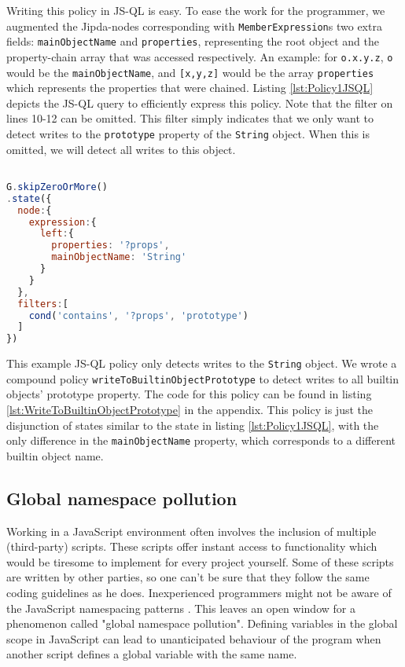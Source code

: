 Writing this policy in JS-QL is easy. To ease the work for the programmer, we augmented the Jipda-nodes corresponding with \texttt{MemberExpression}s two extra fields: \texttt{mainObjectName} and \texttt{properties}, representing the root object and the property-chain array that was accessed respectively. An example: for \texttt{o.x.y.z}, \texttt{o} would be the \texttt{mainObjectName}, and \texttt{[x,y,z]} would be the array \texttt{properties} which represents the properties that were chained. Listing \ref{lst:Policy1JSQL} depicts the JS-QL query to efficiently express this policy. Note that the filter on lines 10-12 can be omitted. This filter simply indicates that we only want to detect writes to the \texttt{prototype} property of the \texttt{String} object. When this is omitted, we will detect all writes to this object.

\begin{lstlisting}[label={lst:Policy1JSQL},language=JavaScript,caption=Policy 1 in JS-QL,mathescape=true]  % float=t?

G.skipZeroOrMore()
.state({
  node:{
    expression:{
      left:{
        properties: '?props',
        mainObjectName: 'String'
      }
    }
  },
  filters:[
    cond('contains', '?props', 'prototype')
  ]
})

\end{lstlisting}

This example JS-QL policy only detects writes to the \texttt{String} object. We wrote a compound policy \texttt{writeToBuiltinObjectPrototype} to detect writes to all builtin objects' prototype property. The code for this policy can be found in listing \ref{lst:WriteToBuiltinObjectPrototype} in the appendix. This policy is just the disjunction of states similar to the state in listing \ref{lst:Policy1JSQL}, with the only difference in the \texttt{mainObjectName} property, which corresponds to a different builtin object name.

\subsection{Global namespace pollution}

Working in a JavaScript environment often involves the inclusion of multiple (third-party) scripts. These scripts offer instant access to functionality which would be tiresome to implement for every project yourself. Some of these scripts are written by other parties, so one can't be sure that they follow the same coding guidelines as he does. Inexperienced programmers might not be aware of the JavaScript namespacing patterns \cite{JSNamespacing}. This leaves an open window for a phenomenon called "global namespace pollution". Defining variables in the global scope in JavaScript can lead to unanticipated behaviour of the program when another script defines a global variable with the same name.

